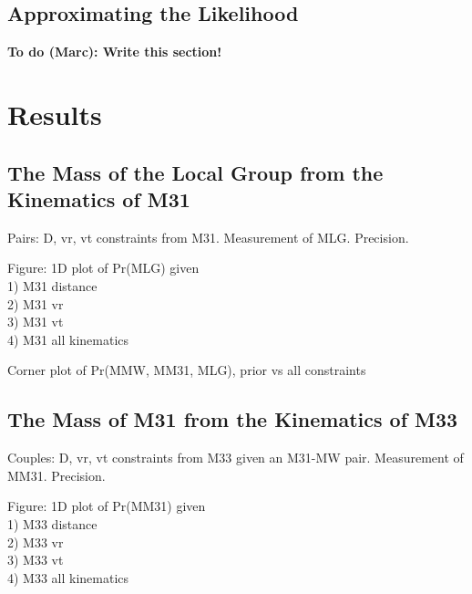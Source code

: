\documentclass{emulateapj}
\newcommand{\todo}[2]{{\bf To do (#1): #2}}
\begin{document}

\subsection{Approximating the Likelihood}
\label{sec:lhood}

\todo{Marc}{Write this section!}


\section{Results}
\label{sec:results}


\subsection{The Mass of the Local Group from the Kinematics of M31}
\label{sec:results:LGmass}

Pairs: D, vr, vt constraints from M31. 
Measurement of  MLG. Precision. 

Figure: 1D plot of Pr(MLG) given \\
  1) M31 distance\\
  2) M31 vr\\
  3) M31 vt\\
  4) M31 all kinematics

Corner plot of Pr(MMW, MM31, MLG), prior vs all constraints



\subsection{The Mass of M31 from the Kinematics of M33}
\label{sec:results:M31mass}

Couples: D, vr, vt constraints from M33 given an M31-MW pair. 
Measurement of  MM31. Precision. 

Figure: 1D plot of Pr(MM31) given \\
  1) M33 distance\\
  2) M33 vr\\
  3) M33 vt\\
  4) M33 all kinematics
\end{document}
